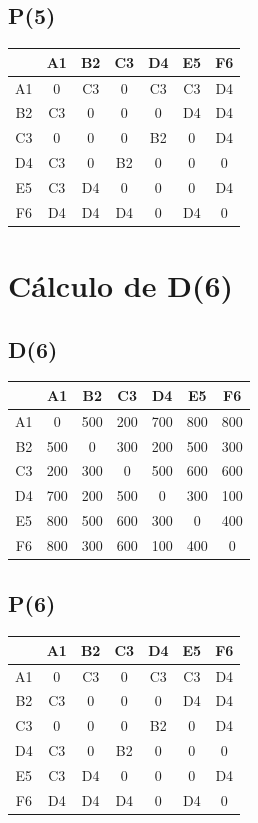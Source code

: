 \documentclass[a4paper,11pt]{article}
\begin{document}
\subsection*{P(5)}
\begin{center}
\begin{tabular}{c|cccccc}
 & A1 & B2 & C3 & D4 & E5 & F6 \\ \hline
A1 & 0 & C3 & 0 & C3 & C3 & D4 \\
B2 & C3 & 0 & 0 & 0 & D4 & D4 \\
C3 & 0 & 0 & 0 & B2 & 0 & D4 \\
D4 & C3 & 0 & B2 & 0 & 0 & 0 \\
E5 & C3 & D4 & 0 & 0 & 0 & D4 \\
F6 & D4 & D4 & D4 & 0 & D4 & 0 \\
\end{tabular}
\end{center}
\newpage
\section*{Cálculo de D(6)}
\subsection*{D(6)}
\begin{center}
\begin{tabular}{c|cccccc}
 & A1 & B2 & C3 & D4 & E5 & F6 \\ \hline
A1 & 0 & 500 & 200 & 700 & 800 & 800 \\
B2 & 500 & 0 & 300 & 200 & 500 & 300 \\
C3 & 200 & 300 & 0 & 500 & 600 & 600 \\
D4 & 700 & 200 & 500 & 0 & 300 & 100 \\
E5 & 800 & 500 & 600 & 300 & 0 & 400 \\
F6 & 800 & 300 & 600 & 100 & 400 & 0 \\
\end{tabular}
\end{center}
\subsection*{P(6)}
\begin{center}
\begin{tabular}{c|cccccc}
 & A1 & B2 & C3 & D4 & E5 & F6 \\ \hline
A1 & 0 & C3 & 0 & C3 & C3 & D4 \\
B2 & C3 & 0 & 0 & 0 & D4 & D4 \\
C3 & 0 & 0 & 0 & B2 & 0 & D4 \\
D4 & C3 & 0 & B2 & 0 & 0 & 0 \\
E5 & C3 & D4 & 0 & 0 & 0 & D4 \\
F6 & D4 & D4 & D4 & 0 & D4 & 0 \\
\end{tabular}
\end{center}
\newpage
\end{document}

